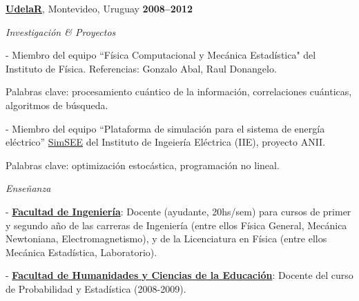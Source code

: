 \documentclass[10pt]{article}
\newenvironment{outerlist}[1][\enskip\textbullet]%
        {\begin{itemize}[#1]}{\end{itemize}%
         \vspace{-.6\baselineskip}}
\newenvironment{innerlist}[1][\enskip\textbullet]%
        {\begin{compactitem}[#1]}{\end{compactitem}}
\begin{document}
\href{http://www.udelar.edu.uy}{\textbf{UdelaR}}, Montevideo, Uruguay 
\hfill\textbf{2008--2012}

\begin{outerlist}
\item[]\textit{Investigación \& Proyectos}
\begin{innerlist}
\item[-] Miembro del equipo ``Física Computacional y Mecánica Estadística" del Instituto de Física. Referencias: Gonzalo Abal, Raul Donangelo. 

Palabras clave: procesamiento cuántico de la información, correlaciones cuánticas, algoritmos de búsqueda. 
\item[-] Miembro del equipo ``Plataforma de simulaci\'{o}n para el sistema de energ\'{i}a el\'{e}ctrico'' \href{http://iie.fing.edu.uy/simsee/}{SimSEE} del Instituto de Ingeiería Eléctrica (IIE), proyecto ANII. 

Palabras clave: optimización estocástica, programación no lineal.
\end{innerlist}

\item[]\textit{Enseñanza}
\begin{innerlist}
	\item[-] \href{http://www.fing.edu.uy}{\textbf{Facultad de Ingenier\'ia}}: Docente (ayudante, 20hs/sem) para cursos de primer y segundo año de las carreras de Ingeniería (entre ellos Física General, Mecánica Newtoniana, Electromagnetismo), y de la Licenciatura en Física (entre ellos Mecánica Estadística, Laboratorio).
	\item[-] \href{http://www.fhuce.edu.uy/}{\textbf{Facultad de Humanidades y Ciencias de la Educaci\'{o}n}}: Docente del curso de Probabilidad y Estadística (2008-2009).
\end{innerlist}

\end{outerlist}

\end{document}
